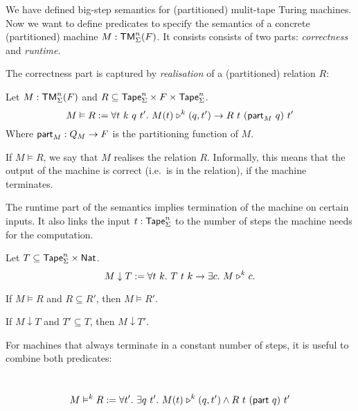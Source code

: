 We have defined big-step semantics for (partitioned) mulit-tape Turing machines.  Now we want to define predicates to specify the semantics of a
concrete (partitioned) machine $M: \textsf{TM}_\Sigma^n(F)$.  It consists consists of two parts: \emph{correctness} and \emph{runtime}.

The correctness part is captured by \emph{realisation} of a (partitioned) relation $R$:

\begin{definition}[Realisation]
  \label{def:realisation}
  Let $M:\textsf{TM}_\Sigma^n(F)$ and $R \subseteq \textsf{Tape}_\Sigma^n \times F \times \textsf{Tape}_\Sigma^n$.
  \[
    M \vDash R :=
    \forall t~k~q~t'.~M(t) \mathrel{\triangleright}^k (q, t') \rightarrow
    R~t~(\textsf{part}_M~q)~t'
  \]
  Where $\textsf{part}_M : Q_M \rightarrow F$ is the partitioning function of $M$.
\end{definition}

If $M \vDash R$, we say that $M$ realises the relation $R$.  Informally, this means that the output of the machine is correct (i.e.\ is in the
relation), if the machine terminates.

The runtime part of the semantics implies termination of the machine on certain inputs.  It also links the input $t:\textsf{Tape}_\Sigma^n$ to the number of
steps the machine needs for the computation.

\begin{definition}
  \label{def:termination}
  Let $T \subseteq \textsf{Tape}_\Sigma^n \times \textsf{Nat}$.
  \[
    M \downarrow T :=
    \forall t~k.~T~t~k \rightarrow
    \exists c.~M \mathrel{\triangleright}^k c.
  \]
\end{definition}


\begin{lemma}
  \label{lem:Realise_monotone}
  If $M \vDash R$ and $R \subseteq R'$, then $M \vDash R'$.
\end{lemma}

\begin{lemma}
  \label{lem:TerminatesIn_monotone}
  If $M \downarrow T$ and $T' \subseteq T$, then $M \downarrow T'$.
\end{lemma}


For machines that always terminate in a constant number of steps, it is useful to combine both predicates:
\begin{definition}
  \label{def:RealiseIn}
  ~
  \[
    M \vDash^k R :=
    \forall t'.~
    \exists q~t'.~
    M(t) \mathrel{\triangleright}^k(q, t') \land R~t~(\textsf{part}~q)~t'
  \]
\end{definition}

